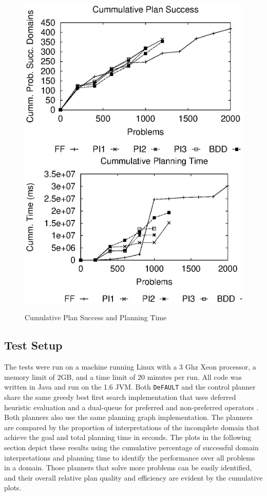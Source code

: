 \documentclass{article}
\def\citep#1{\cite{#1}}
\def\FFRISKY{{\tt DeFAULT}}
\begin{document}
\begin{figure}[t]
\includegraphics[width=.5\linewidth]{./alldom-deadline.eps}
\includegraphics[width=.5\linewidth]{./alldom-deadline-time.eps}
\caption{\label{fig:plan} Cumulative Plan Success and Planning Time}
\end{figure}		

\subsection{Test Setup} The tests were run on a machine running Linux with a 3 Ghz Xeon processor, a memory limit of 2GB, and a time limit of 20 minutes per run.  All code was written in Java and run on the 1.6 JVM.  Both \FFRISKY{} and the control planner share the same greedy best first search implementation that uses deferred heuristic evaluation and a dual-queue for preferred and non-preferred operators \citep{DBLP:journals/jair/Helmert06}.  Both planners also use the same planning graph implementation.  
The planners are compared by the proportion of interpretations of the incomplete domain that achieve the goal and total planning time in seconds.  
The plots in the following section depict these results using the cumulative percentage of successful domain interpretations and planning time to identify the performance over all problems in a domain.  Those planners that solve more problems can be easily identified, and their overall relative plan quality and efficiency are evident by the cumulative plots.
\end{document}
